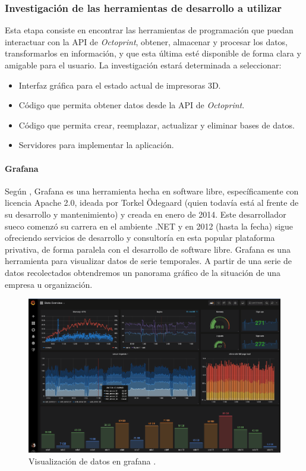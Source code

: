 \subsubsection{Investigación de las herramientas de desarrollo a utilizar}

Esta etapa consiste en encontrar las herramientas de programación que puedan interactuar con la API de \textit{Octoprint}, obtener, almacenar y procesar los datos, transformarlos en información, y que esta última esté disponible de forma clara y amigable para el usuario. La investigación estará determinada a seleccionar:

\begin{itemize}
\item Interfaz gráfica para el estado actual de impresoras 3D.
\item Código que permita obtener datos desde la API de \textit{Octoprint}.
\item Código que permita crear, reemplazar, actualizar y eliminar bases de datos.
\item Servidores para implementar la aplicación. 
\end{itemize} 

\paragraph{Grafana} Según \cite{olano2019}, Grafana es una herramienta hecha en software libre, específicamente con licencia Apache 2.0, ideada por Torkel Ödegaard (quien todavía está al frente de su desarrollo y mantenimiento) y creada en enero de 2014. Este desarrollador sueco comenzó su carrera en el ambiente .NET y en 2012 (hasta la fecha) sigue ofreciendo servicios de desarrollo y consultoría en esta popular plataforma privativa, de forma paralela con el desarrollo de software libre. Grafana es una herramienta para visualizar datos de serie temporales. A partir de una serie de datos recolectados obtendremos un panorama gráfico de la situación de una empresa u organización.

\begin{figure}[H]
\centering
\includegraphics[scale=0.5]{images/grafana.png}
\caption{Visualización de datos en grafana \citep{olano2019}.}
\end{figure}

